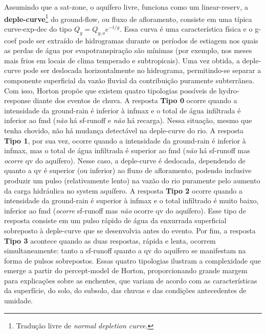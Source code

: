 \documentclass[./main.tex]{subfiles}
\begin{document}
\noindent Assumindo que a \gls{sat-zone}, o aquífero livre, funciona como um \gls{linear-reserv}, a \textbf{\gls{deple-curve}}\footnote{Tradução livre de \textit{normal depletion curve}.} do \gls{ground-flow}, ou fluxo de afloramento, consiste em uma típica \gls{curve-exp-dec} do tipo $Q_{g} = Q_{g, o} e^{-t/g}$. Essa curva é uma característica física e o \gls{g-coef} pode ser extraído de hidrogramas durante os períodos de estiagem nos quais as perdas de água por evapotranspiração são mínimas (por exemplo, nos meses mais frios em locais de clima temperado e subtropicais). Uma vez obtida, a \gls{deple-curve} pode ser deslocada horizontalmente no hidrograma, permitindo-se separar a componente superficial da vazão fluvial da contribuição puramente subterrânea. Com isso, Horton propõe que existem quatro  tipologias possíveis de \gls{hydro-response} diante dos eventos de chuva. A resposta \textbf{Tipo 0} ocorre quando a intensidade da \gls{ground-rain} é inferior à \gls{infmax} e o total de água infiltrada é inferior ao \gls{fmd} (\textit{não} há \gls{sf-runoff} e \textit{não} há recarga). Nessa situação, mesmo que tenha chovido, não há mudança detectável na \gls{deple-curve} do rio. A resposta \textbf{Tipo 1}, por sua vez, ocorre quando a intensidade da \gls{ground-rain} é inferior à \gls{infmax}, mas o total de água infiltrada é superior ao \gls{fmd} (\textit{não} há \gls{sf-runoff} mas \textit{ocorre} \gls{qv} do aquífero). Nesse caso, a \gls{deple-curve} é deslocada, dependendo de quanto a \gls{qv} é superior (ou inferior) ao fluxo de afloramento, podendo inclusive produzir um pulso (relativamente lento) na vazão do rio puramente pelo aumento da carga hidráulica no \gls{system} aquífero. A resposta \textbf{Tipo 2} ocorre quando a intensidade da \gls{ground-rain} é superior à \gls{infmax} e o total infiltrado é muito baixo, inferior ao \gls{fmd} (\textit{ocorre} \gls{sf-runoff} mas \textit{não} ocorre \gls{qv} do aquífero). Esse tipo de resposta consiste em um pulso rápido de água da enxurrada superficial sobreposto à \gls{deple-curve} que se desenvolvia antes do evento. Por fim, a resposta \textbf{Tipo 3} acontece quando as duas respostas, rápida e lenta, ocorrem simultaneamente: tanto a \gls{sf-runoff} quanto a \gls{qv} do aquífero se manifestam na forma de pulsos sobrepostos. Essas quatro tipologias ilustram a complexidade que emerge a partir do \gls{percept-model} de Horton, proporcionando grande margem para explicações sobre as enchentes, que variam de acordo com as características da superfície, do solo, do subsolo, das chuvas e das condições antecedentes de umidade.
\end{document}

